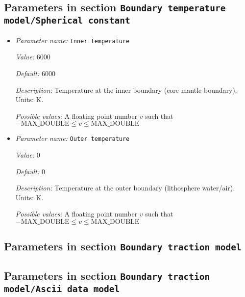 \subsection{Parameters in section \tt Boundary temperature model/Spherical constant}
\label{parameters:Boundary_20temperature_20model/Spherical_20constant}

\begin{itemize}
\item {\it Parameter name:} {\tt Inner temperature}
\label{parameters:Boundary temperature model/Spherical constant/Inner temperature}


{\it Value:} 6000


{\it Default:} 6000


{\it Description:} Temperature at the inner boundary (core mantle boundary). Units: K.


{\it Possible values:} A floating point number $v$ such that $-\text{MAX\_DOUBLE} \leq v \leq \text{MAX\_DOUBLE}$
\item {\it Parameter name:} {\tt Outer temperature}
\label{parameters:Boundary temperature model/Spherical constant/Outer temperature}


{\it Value:} 0


{\it Default:} 0


{\it Description:} Temperature at the outer boundary (lithosphere water/air). Units: K.


{\it Possible values:} A floating point number $v$ such that $-\text{MAX\_DOUBLE} \leq v \leq \text{MAX\_DOUBLE}$
\end{itemize}

\subsection{Parameters in section \tt Boundary traction model}
\label{parameters:Boundary_20traction_20model}


\subsection{Parameters in section \tt Boundary traction model/Ascii data model}
\label{parameters:Boundary_20traction_20model/Ascii_20data_20model}

